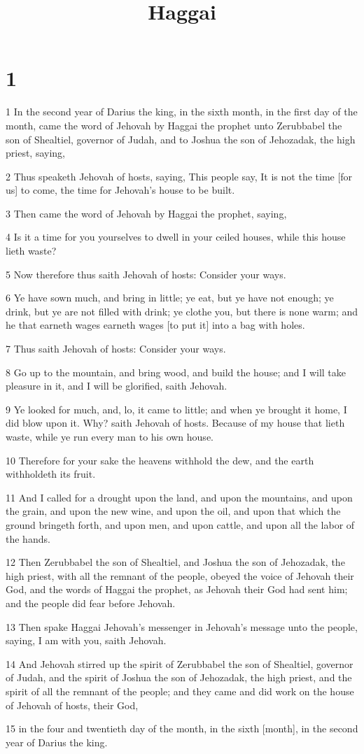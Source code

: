 

\title{Haggai}

\chapter{1}

\par 1 In the second year of Darius the king, in the sixth month, in the first day of the month, came the word of Jehovah by Haggai the prophet unto Zerubbabel the son of Shealtiel, governor of Judah, and to Joshua the son of Jehozadak, the high priest, saying,
\par 2 Thus speaketh Jehovah of hosts, saying, This people say, It is not the time [for us] to come, the time for Jehovah's house to be built.
\par 3 Then came the word of Jehovah by Haggai the prophet, saying,
\par 4 Is it a time for you yourselves to dwell in your ceiled houses, while this house lieth waste?
\par 5 Now therefore thus saith Jehovah of hosts: Consider your ways.
\par 6 Ye have sown much, and bring in little; ye eat, but ye have not enough; ye drink, but ye are not filled with drink; ye clothe you, but there is none warm; and he that earneth wages earneth wages [to put it] into a bag with holes.
\par 7 Thus saith Jehovah of hosts: Consider your ways.
\par 8 Go up to the mountain, and bring wood, and build the house; and I will take pleasure in it, and I will be glorified, saith Jehovah.
\par 9 Ye looked for much, and, lo, it came to little; and when ye brought it home, I did blow upon it. Why? saith Jehovah of hosts. Because of my house that lieth waste, while ye run every man to his own house.
\par 10 Therefore for your sake the heavens withhold the dew, and the earth withholdeth its fruit.
\par 11 And I called for a drought upon the land, and upon the mountains, and upon the grain, and upon the new wine, and upon the oil, and upon that which the ground bringeth forth, and upon men, and upon cattle, and upon all the labor of the hands.
\par 12 Then Zerubbabel the son of Shealtiel, and Joshua the son of Jehozadak, the high priest, with all the remnant of the people, obeyed the voice of Jehovah their God, and the words of Haggai the prophet, as Jehovah their God had sent him; and the people did fear before Jehovah.
\par 13 Then spake Haggai Jehovah's messenger in Jehovah's message unto the people, saying, I am with you, saith Jehovah.
\par 14 And Jehovah stirred up the spirit of Zerubbabel the son of Shealtiel, governor of Judah, and the spirit of Joshua the son of Jehozadak, the high priest, and the spirit of all the remnant of the people; and they came and did work on the house of Jehovah of hosts, their God,
\par 15 in the four and twentieth day of the month, in the sixth [month], in the second year of Darius the king.

